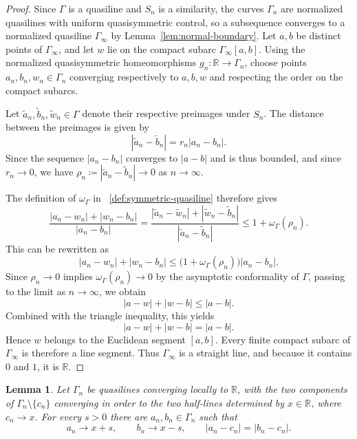 \documentclass[10pt,a4paper]{amsart}
\numberwithin{equation}{section}
\newtheorem{lemma}[theorem]{Lemma}
\newcommand{\R}{\mathbb{R}}
\begin{document}
\begin{proof}
Since $\Gamma$ is a quasiline and $S_n$ is a similarity, the curves $\Gamma_n$ are normalized quasilines with uniform quasisymmetric control, so a subsequence converges to a normalized quasiline $\Gamma_\infty$ by Lemma~\ref{lem:normal-boundary}.
Let $a,b$ be distinct points of $\Gamma_\infty$, and let $w$ lie on the compact subarc $\Gamma_\infty[a,b]$.  
Using the normalized quasisymmetric homeomorphisms $g_n\colon\R\to \Gamma_n$, choose points $a_n,b_n,w_n\in\Gamma_n$ converging respectively to $a,b,w$ and respecting the order on the compact subarcs.  

Let $\tilde{a}_n, \tilde{b}_n, \tilde{w}_n \in \Gamma$ denote their respective preimages under $S_n$. 
The distance between the preimages is given by 
\[
 |\tilde{a}_n-\tilde{b}_n| = r_n|a_n-b_n|.
\]
Since the sequence $|a_n-b_n|$ converges to $|a-b|$ and is thus bounded, and since $r_n \to 0$, we have $\rho_n \coloneqq  |\tilde{a}_n-\tilde{b}_n| \to 0$ as $n \to \infty$. 

The definition of $\omega_\Gamma$ in ~\eqref{def:symmetric-quasiline} therefore gives
\[
 \frac{|a_n-w_n|+|w_n-b_n|}{|a_n-b_n|} = \frac{|\tilde{a}_n-\tilde{w}_n|+|\tilde{w}_n-\tilde{b}_n|}{|\tilde{a}_n-\tilde{b}_n|} \leq 1 + \omega_\Gamma(\rho_n).
\]
This can be rewritten as
\[
 |a_n-w_n|+|w_n-b_n| \leq \bigl(1+\omega_\Gamma(\rho_n)\bigr)|a_n-b_n|.
\]
Since $\rho_n \to 0$ implies $\omega_\Gamma(\rho_n) \to 0$ by the asymptotic conformality of $\Gamma$,
passing to the limit as $n \to \infty$, we obtain
\[
 |a-w|+|w-b| \leq |a-b|.
\]
Combined with the triangle inequality, this yields
\[
 |a-w|+|w-b|=|a-b|.
\]
Hence $w$ belongs to the Euclidean segment $[a,b]$.  
Every finite compact subarc of $\Gamma_\infty$ is therefore a line segment. 
Thus $\Gamma_\infty$ is a straight line, and because it contains $0$ and $1$, it is $\R$.
\end{proof}

\begin{lemma}\label{lem:equidistant-approx}
Let $\Gamma_n$ be quasilines converging locally to $\R$, with the two components of $\Gamma_n\setminus\{c_n\}$ converging in order to the two half-lines determined by $x\in\R$, where $c_n\to x$.  
For every $s>0$ there are $a_n,b_n\in\Gamma_n$ such that
\[
 a_n\to x+s,\qquad b_n\to x-s,
 \qquad |a_n-c_n|=|b_n-c_n|.
\]
\end{lemma}
\end{document}
